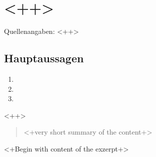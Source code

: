 \documentclass[a4paper, abstract=on]{scrartcl}
\begin{document}
    \section*{<++>}
    Quellenangaben: <++>

    \vspace{0.5cm}

    \subsection*{Hauptaussagen}

    \begin{enumerate}
        \item <+FIRST  argument+>
        \item <+SECOND argument+>
        \item <+THIRD  argument+>
    \end{enumerate}<++>

    \begin{abstract}
    <+very short summary of the content+>
    \end{abstract}
    \vspace{1cm}

    <+Begin with content of the exzerpt+>

    \printbibliography
\end{document}

